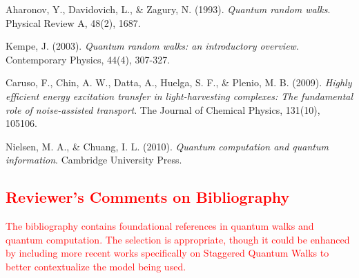 \documentclass[11pt,a4paper]{article}
\begin{document}

\begin{thebibliography}{9}

Aharonov, Y., Davidovich, L., \& Zagury, N. (1993).
\emph{Quantum random walks}.
Physical Review A, 48(2), 1687.

Kempe, J. (2003).
\emph{Quantum random walks: an introductory overview}.
Contemporary Physics, 44(4), 307-327.

Caruso, F., Chin, A. W., Datta, A., Huelga, S. F., \& Plenio, M. B. (2009).
\emph{Highly efficient energy excitation transfer in light-harvesting complexes: The fundamental role of noise-assisted transport}.
The Journal of Chemical Physics, 131(10), 105106.

Nielsen, M. A., \& Chuang, I. L. (2010).
\emph{Quantum computation and quantum information}.
Cambridge University Press.

\end{thebibliography}

\textcolor{red}{
\subsection*{Reviewer's Comments on Bibliography}
The bibliography contains foundational references in quantum walks and quantum computation. The selection is appropriate, though it could be enhanced by including more recent works specifically on Staggered Quantum Walks to better contextualize the model being used.
}
\end{document}
